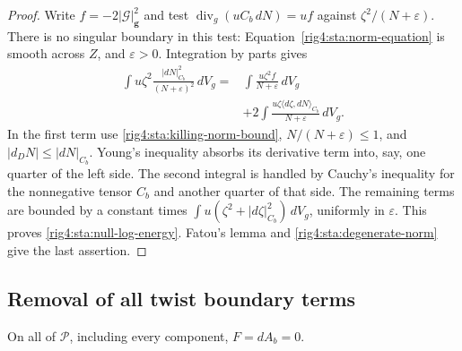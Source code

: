\begin{proof}
Write $f=-2|\mathcal G|_{\mathbf g}^2$ and test
$\operatorname{div}_g(uC_b\,dN)=uf$ against
$\zeta^2/(N+\varepsilon)$. There is no singular boundary in this test:
Equation~\eqref{rig4:sta:norm-equation} is smooth across $Z$, and
$\varepsilon>0$. Integration by parts gives
\begin{equation}\label{rig4:sta:log-test}
 \begin{split}
 \int u\zeta^2\frac{|dN|_{C_b}^2}{(N+\varepsilon)^2}\,dV_g
 ={}&\int\frac{u\zeta^2 f}{N+\varepsilon}\,dV_g\\
 &+2\int\frac{u\zeta\langle d\zeta,dN\rangle_{C_b}}
                  {N+\varepsilon}\,dV_g.
 \end{split}
\end{equation}
In the first term use \eqref{rig4:sta:killing-norm-bound},
$N/(N+\varepsilon)\le1$, and
$|d_DN|\le|dN|_{C_b}$. Young's inequality absorbs its derivative
term into, say, one quarter of the left side. The second integral is
handled by Cauchy's inequality for the nonnegative tensor $C_b$ and
another quarter of that side. The remaining terms are bounded by a
constant times
$\int u(\zeta^2+|d\zeta|_{C_b}^2)\,dV_g$, uniformly in
$\varepsilon$. This proves \eqref{rig4:sta:null-log-energy}. Fatou's lemma
and \eqref{rig4:sta:degenerate-norm} give the last assertion.
\end{proof}

\subsection{Removal of all twist boundary terms}

\begin{proposition}\label{rig4:sta:twist-vanishes}
On all of $\mathcal P$, including every component, $F=dA_b=0$.
\end{proposition}


